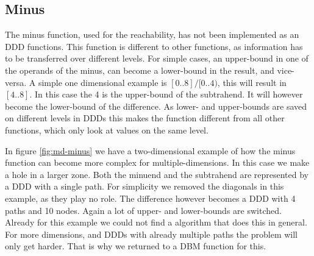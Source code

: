 \subsection{Minus}
The minus function, used for the reachability, has not been implemented as an DDD functions. This function is different to other functions, as information has to be transferred over different levels. For simple cases, an upper-bound in one of the operands of the minus, can become a lower-bound in the result, and vice-versa. A simple one dimensional example is $[0..8] / [0..4)$, this will result in $[4..8]$. In this case the 4 is the upper-bound of the subtrahend. It will however become the lower-bound of the difference. As lower- and upper-bounds are saved on different levels in DDDs this makes the function different from all other functions, which only look at values on the same level.

In figure \ref{fig:md-minus} we have a two-dimensional example of how the minus function can become more complex for multiple-dimensions. In this case we make a hole in a larger zone. Both the minuend and the subtrahend are represented by a DDD with a single path. For simplicity we removed the diagonals in this example, as they play no role. The difference however becomes a DDD with 4 paths and 10 nodes. Again a lot of upper- and lower-bounds are switched. Already for this example we could not find a algorithm that does this in general. For more dimensions, and DDDs with already multiple paths the problem will only get harder. That is why we returned to a DBM function for this.



 


